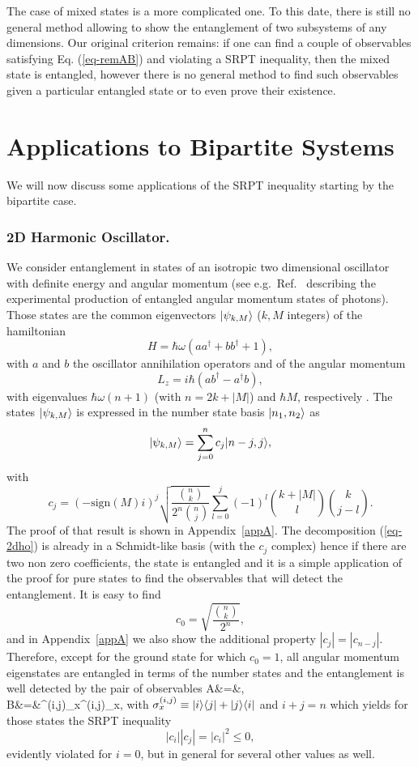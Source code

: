 The case of mixed states is a more complicated one. To this date, there is still no general method allowing to show the entanglement of two subsystems of any dimensions. Our original criterion remains: if one can find a couple of observables satisfying Eq. (\ref{eq-remAB}) and violating a SRPT inequality, then the mixed state is entangled, however there is no general method to find such observables given a particular entangled state or to even prove their existence.

\section{Applications to Bipartite Systems}  \label{sec-SPRTbip}

 We will now discuss some applications of the SRPT inequality starting by the bipartite case.

\subsubsection{2D Harmonic Oscillator.} 

We consider entanglement in states of an isotropic two dimensional oscillator with definite energy and angular momentum (see e.g.~Ref.~\cite{Mai01} describing the experimental production of entangled angular momentum states of photons). Those states are the common eigenvectors $| \psi_{k,M} \rangle$ ($k, M$ integers) of the hamiltonian 
\[ H=\hbar \omega(a a^\dagger + b b^\dagger +1),\]
with $a$ and $b$ the oscillator annihilation operators and of the angular momentum 
\[ L_z = i \hbar (a b^\dagger - a^\dagger b),\]
 with eigenvalues $\hbar \omega(n+1)$ (with $n=2k + |M|$) and $\hbar M$, respectively . The states $| \psi_{k,M} \rangle$ is expressed in the number state basis $| n_1,n_2 \rangle$ as 
 \[ | \psi_{k,M} \rangle = \sum_{j=0}^{n}c_j | n-j,j \rangle,\label{eq-2dho}\]
 with
 \[ c_j =  \left(- \textrm{sign}(M) i \right)^j  \sqrt{\frac{\binom{n}{k} }{2^n \binom{n}{j}}}    \sum_{l=0}^{j}(-1)^l \binom{k+|M|}{l} \binom{k}{j-l} . \]
 The proof of that result is shown in Appendix~\ref{appA}. The decomposition (\ref{eq-2dho}) is already in a Schmidt-like basis (with the $c_j$ complex) hence if there are two non zero coefficients, the state is entangled and it is a simple application of the proof for pure states to find the observables that will detect the entanglement. It is easy to find
 \[ c_0 = \sqrt{\frac{\binom{n}{k} }{2^n}}, \]
and in Appendix~\ref{appA} we also show the additional property $|c_j|=|c_{n-j}|$. Therefore, except for the ground state for which $c_0=1$, all angular momentum eigenstates are entangled in terms of the number states and the entanglement is well detected by the pair of observables
\bea  
A&=&, \\  B&=&\sigma^{(i,j)}_x\otimes\sigma^{(i,j)}_x, \label{eq-AB2D}
\eea
with $\sigma_x^{(i,j)} \equiv | i \rangle \langle j | +| j \rangle \langle i |$ and $i+j =n$ which yields for those states the SRPT inequality 
\[ |c_i||c_j|=|c_i|^2 \le 0 ,\] 
evidently violated for $i=0$, but in general for several other values as well.

